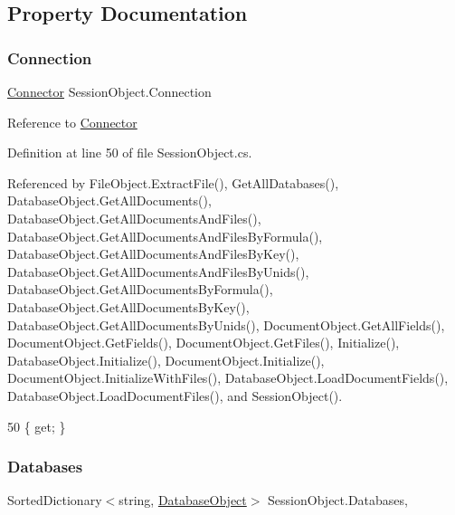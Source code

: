 \subsection{Property Documentation}
\mbox{\label{class_session_object_a014bdbf705a753540e19bfb53030c55c}} 
\subsubsection{\texorpdfstring{Connection}{Connection}}
{\footnotesize\ttfamily \mbox{\hyperlink{class_connector}{Connector}} Session\+Object.\+Connection\hspace{0.3cm}{\ttfamily [get]}}



Reference to \mbox{\hyperlink{class_connector}{Connector}} 



Definition at line 50 of file Session\+Object.\+cs.



Referenced by File\+Object.\+Extract\+File(), Get\+All\+Databases(), Database\+Object.\+Get\+All\+Documents(), Database\+Object.\+Get\+All\+Documents\+And\+Files(), Database\+Object.\+Get\+All\+Documents\+And\+Files\+By\+Formula(), Database\+Object.\+Get\+All\+Documents\+And\+Files\+By\+Key(), Database\+Object.\+Get\+All\+Documents\+And\+Files\+By\+Unids(), Database\+Object.\+Get\+All\+Documents\+By\+Formula(), Database\+Object.\+Get\+All\+Documents\+By\+Key(), Database\+Object.\+Get\+All\+Documents\+By\+Unids(), Document\+Object.\+Get\+All\+Fields(), Document\+Object.\+Get\+Fields(), Document\+Object.\+Get\+Files(), Initialize(), Database\+Object.\+Initialize(), Document\+Object.\+Initialize(), Document\+Object.\+Initialize\+With\+Files(), Database\+Object.\+Load\+Document\+Fields(), Database\+Object.\+Load\+Document\+Files(), and Session\+Object().


\begin{DoxyCode}
50 \{ \textcolor{keyword}{get}; \}
\end{DoxyCode}
\mbox{\label{class_session_object_aa0b75f5b9d0a6325f436e08db27204a2}} 
\subsubsection{\texorpdfstring{Databases}{Databases}}
{\footnotesize\ttfamily Sorted\+Dictionary$<$string, \mbox{\hyperlink{class_database_object}{Database\+Object}}$>$ Session\+Object.\+Databases\hspace{0.3cm}{\ttfamily [get]}, {\ttfamily [set]}}



